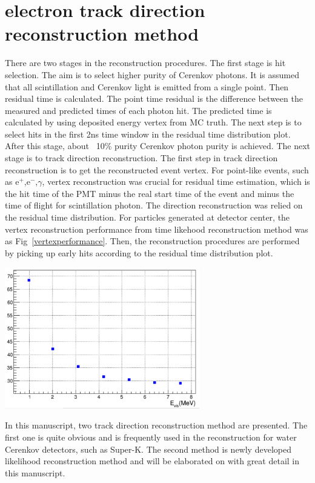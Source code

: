 \documentclass[a4paper,10pt]{cpc-hepnp}
\begin{document}
\section{electron track direction reconstruction method}
There are two stages in the reconstruction procedures. The first stage is hit
selection. The aim is to select higher purity of Cerenkov photons. It is
assumed that all scintillation and Cerenkov light is emitted from a single
point. Then residual time is calculated. The point time residual is the
difference between the measured and predicted times of each photon hit.
The predicted time is calculated by using deposited energy vertex from MC truth.
The next step
is to select hits in the first 2ns time window in the residual time
distribution plot. After this stage, about ~10\% purity Cerenkov photon purity
is achieved. The next stage is to track direction reconstruction. 
The first step in track direction reconstruction is to get the reconstructed event vertex.
For point-like events, such as e$^+$,e$^-$,$\gamma$, vertex reconstruction was crucial for 
residual time estimation, which is the hit time of the PMT minus the real start time of the event and minus the time of flight for
scintillation photon. The direction reconstruction was relied on the residual time distribution.
For particles generated at detector center, the vertex reconstruction performance from time likehood reconstruction method
was as Fig~\ref{vertexperformance}.
Then, the reconstruction procedures are performed by picking up early hits according to the residual time distribution plot.
\begin{center}
\includegraphics[width=8.5cm]{plots/vertexper}
\end{center}

In this manuscript, two track direction reconstruction method are presented.
The first one is quite obvious and is frequently used in the reconstruction for
water Cerenkov detectors, such as Super-K.
The second method is newly developed likelihood reconstruction method and will
be
elaborated on with great detail in this manuscript.
\end{document}

